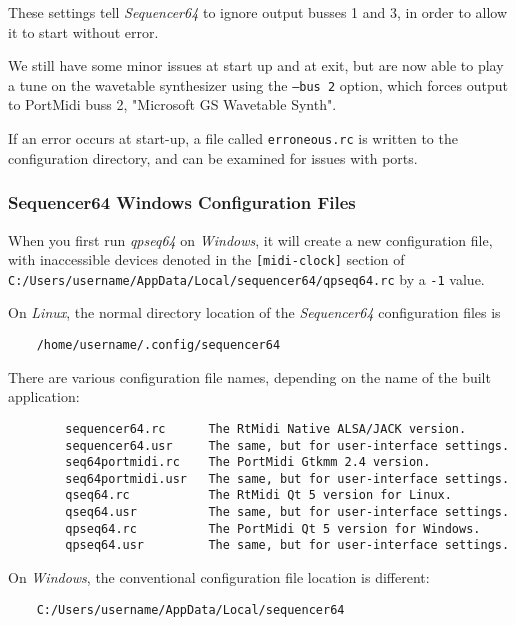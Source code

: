    These settings tell \textsl{Sequencer64} to ignore output busses 1 and 3,
   in order to allow it to start without error.

    We still have some minor issues at start up and at exit, but are now able
    to play a tune on the wavetable synthesizer using the
    \texttt{--bus 2} option, which forces output to PortMidi buss 2,
    "Microsoft GS Wavetable Synth".

    If an error occurs at start-up, a file called \texttt{erroneous.rc} is
    written to the configuration directory, and can be examined for issues with
    ports.

\subsubsection{Sequencer64 Windows Configuration Files}
\label{subsubsec:qt_portmidi_windows_setup_config}

    When you first run \textsl{qpseq64}
    on \textsl{Windows}, it will create a new configuration
    file, with inaccessible devices denoted in the
    \texttt{[midi-clock]} section of
    \texttt{C:/Users/username/AppData/Local/sequencer64/qpseq64.rc}
    by a \texttt{-1} value.

    On \textsl{Linux},
    the normal directory location of the \textsl{Sequencer64} configuration
    files is

\begin{verbatim}
    /home/username/.config/sequencer64
\end{verbatim}

   There are various configuration file names, depending on the name of the
   built application:

\begin{verbatim}
        sequencer64.rc      The RtMidi Native ALSA/JACK version.
        sequencer64.usr     The same, but for user-interface settings.
        seq64portmidi.rc    The PortMidi Gtkmm 2.4 version.
        seq64portmidi.usr   The same, but for user-interface settings.
        qseq64.rc           The RtMidi Qt 5 version for Linux.
        qseq64.usr          The same, but for user-interface settings.
        qpseq64.rc          The PortMidi Qt 5 version for Windows.
        qpseq64.usr         The same, but for user-interface settings.
\end{verbatim}

    On \textsl{Windows}, the conventional configuration file
    location is different:
    
\begin{verbatim}
    C:/Users/username/AppData/Local/sequencer64
\end{verbatim}

